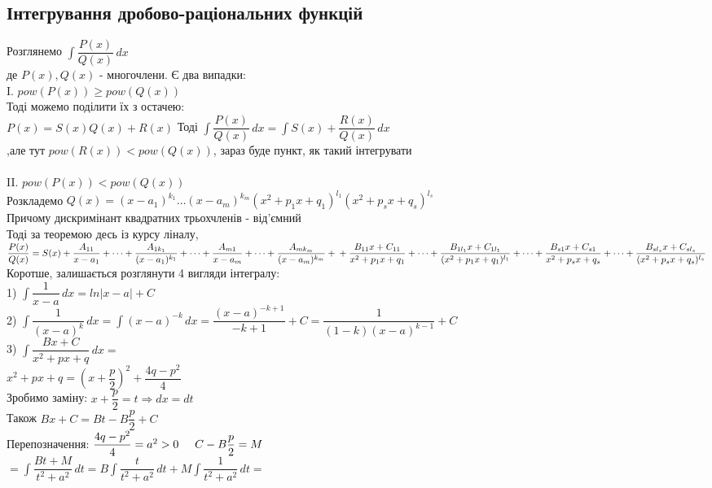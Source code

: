 \documentclass[a4paper, 14pt]{extarticle}
\def\huge{\displaystyle}
\def\bigline{\vspace{5mm}\\}
\def\bigline{\vspace{5mm}\\}
\begin{document}
\subsection{Інтегрування дробово-раціональних функцій}
Розглянемо $\huge \int \dfrac{P(x)}{Q(x)}\,dx$\\
де $P(x), Q(x)$ - многочлени. Є два випадки:\\
I. $pow(P(x)) \geq pow(Q(x))$\\
Тоді можемо поділити їх з остачею:\\
$P(x) = S(x)Q(x) + R(x)$
Тоді $\huge \int \dfrac{P(x)}{Q(x)}\,dx = \int S(x) + \dfrac{R(x)}{Q(x)}\,dx$\\
,але тут $pow(R(x)) < pow(Q(x))$, зараз буде пункт, як такий інтегрувати\\
\bigline
II. $pow(P(x)) < pow(Q(x))$\\
Розкладемо $Q(x) = (x-a_1)^{k_1} \dots (x-a_m)^{k_m} (x^2+p_1x+q_1)^{l_1} (x^2+p_sx+q_s)^{l_s}$\\
Причому дискримінант квадратних трьохчленів - від'ємний\\
Тоді за теоремою десь із курсу ліналу,\\
$\dfrac{P(x)}{Q(x)} = S(x) + \dfrac{A_{11}}{x-a_1} + \dots + \dfrac{A_{1k_1}}{(x-a_1)^{k_1}}+ \dots + \dfrac{A_{m1}}{x-a_m} + \dots + \dfrac{A_{mk_m}}{(x-a_m)^{k_m}} + \\
+ \dfrac{B_{11}x + C_{11}}{x^2+p_1x+q_1} + \dots + \dfrac{B_{1l_1}x + C_{1l_1}}{(x^2+p_1x+q_1)^{l_1}} + \dots + \dfrac{B_{s1}x + C_{s1}}{x^2+p_sx+q_s} + \dots + \dfrac{B_{sl_s}x + C_{sl_s}}{(x^2+p_sx+q_s)^{l_s}}$\\
Коротше, залишається розглянути 4 вигляди інтегралу:
\bigline
1) $\huge \int \dfrac{1}{x-a}\,dx = ln|x-a| + C$
\bigline
2) $\huge \int \dfrac{1}{(x-a)^k}\,dx = \int (x-a)^{-k}\,dx = \dfrac{(x-a)^{-k+1}}{-k+1} + C = \dfrac{1}{(1-k)(x-a)^{k-1}} + C$
\bigline
3) $\huge \int \dfrac{Bx+C}{x^2+px+q}\,dx \boxed{=}$\\
$x^2 + px + q = \left(x + \dfrac{p}{2} \right)^2 + \dfrac{4q-p^2}{4}$\\
Зробимо заміну: $x + \dfrac{p}{2} = t \Rightarrow dx = dt$\\
Також $Bx+C = Bt - B\dfrac{p}{2} + C$\\
Перепозначення: $\dfrac{4q-p^2}{4} = a^2 > 0 \hspace{0.5cm} C - B \dfrac{p}{2} = M$\\
$\boxed{=} \huge \int \dfrac{Bt + M}{t^2 + a^2}\,dt = B \int \dfrac{t}{t^2+a^2}\,dt + M \int \dfrac{1}{t^2+a^2}\,dt \boxed{=}$\\
\end{document}
